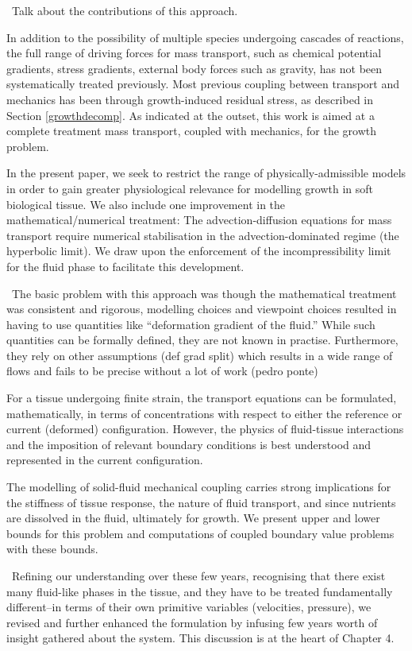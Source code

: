 \textbullet\ Talk about the contributions of this approach.

In addition to the possibility of multiple species undergoing cascades
of reactions, the full range of driving forces for mass transport,
such as chemical potential gradients, stress gradients, external body
forces such as gravity, has not been systematically treated
previously. Most previous coupling between transport and mechanics has
been through growth-induced residual stress, as described in Section 
\ref{growthdecomp}. As indicated at the outset, this work is aimed at
a complete treatment mass transport, coupled with mechanics, for the
growth problem.

In the present paper, we seek to restrict the range of
physically-admissible models in order to gain greater
physiological relevance for modelling growth in soft biological
tissue. We also include one improvement in the mathematical/numerical treatment:
The advection-diffusion equations for mass transport
require numerical stabilisation in the advection-dominated regime
(the hyperbolic limit). We draw upon the enforcement of the
incompressibility limit for the fluid phase to facilitate this
development.

\textbullet\ 
 The basic problem with this approach was though the mathematical
treatment was consistent and rigorous, modelling choices and viewpoint
choices resulted in having to use quantities like ``deformation
gradient of the fluid.'' While such quantities can be formally
defined, they are not known in practise. Furthermore, they rely on
other assumptions (def grad split) which results in a wide range of
flows and fails to be precise without a lot of work (pedro ponte)

 For a tissue undergoing finite strain, the
  transport equations can be formulated, mathematically, in terms of
  concentrations with respect to either the reference or current
  (deformed) configuration. However, the physics of fluid-tissue
  interactions and the imposition of relevant boundary conditions is
  best understood and represented in the current configuration.

 The modelling of solid-fluid mechanical coupling
  carries strong implications for the stiffness of tissue response,
  the nature of fluid transport, and since nutrients are dissolved in
  the fluid, ultimately for growth. We present upper and lower bounds
  for this problem and computations of coupled boundary value problems with
  these bounds.

\textbullet\ 
 Refining our understanding over these few years, recognising that
there exist many fluid-like phases in the tissue, and they have to be
treated fundamentally different--in terms of their own primitive
variables (velocities, pressure), we revised and further enhanced the
formulation by infusing few years worth of insight gathered about the
system. This discussion is at the heart of Chapter 4.


